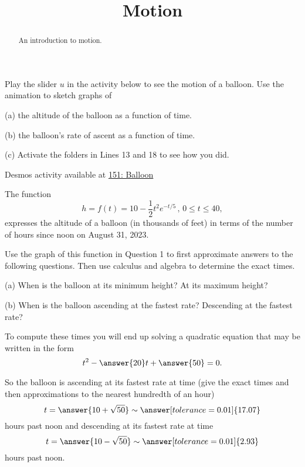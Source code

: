 \documentclass{ximera}
\title{Motion}
\begin{document}
\begin{abstract}
An introduction to motion.
\end{abstract}
\maketitle


\begin{question}  \label{Q:4sdfdsfdellk}

Play the slider $u$ in the activity below to see the motion of a balloon. Use the animation to sketch graphs of

(a) the altitude of the balloon as a function of time.

(b) the balloon's rate of ascent as a function of time.

(c) Activate the folders in Lines 13 and 18 to see how you did.

\begin{onlineOnly}
    \begin{center}
\end{center}
\end{onlineOnly}

Desmos activity available at \href{https://www.desmos.com/calculator/amv52b9ljt}{151: Balloon}

\end{question}


\begin{question}  \label{QDfsdtegg}
The function
\[
     h = f(t) = 10 - \frac{1}{2}t^2 e^{-t/5} \, , \, 0\leq t \leq 40,
\]
expresses the altitude of a balloon (in thousands of feet) in terms of the number of hours since noon on August 31, 2023.

Use the graph of this function in Question 1 to first approximate answers to the following questions. Then use calculus and algebra to determine the exact times.

(a) When is the balloon at its minimum height? At its maximum height?

(b) When is the balloon ascending at the fastest rate? Descending at the fastest rate? 

To compute these times you will end up solving a quadratic equation that may be written in the form
\[
    t^2 - \answer{20}t + \answer{50} = 0.
\]
 
So the balloon is ascending at its fastest rate at time (give the exact times and then approximations to the nearest hundredth of an hour)
\[
    t = \answer{10 + \sqrt{50}} \sim \answer[tolerance=0.01]{17.07}
\]
hours past noon and descending at its fastest rate at time
\[
   t = \answer{10 - \sqrt{50}} \sim \answer[tolerance=0.01]{2.93}
\]
hours past noon.

\end{question}
\end{document}
